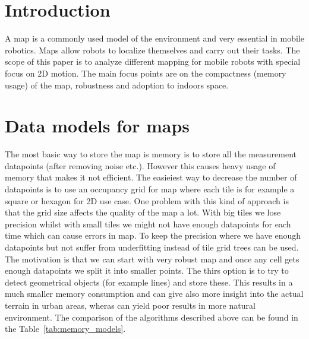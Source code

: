 \documentclass[12pt, a4paper, onecolumn]{article}
\begin{document}
\maketitle

\section{Introduction}
A map is a commonly used model of the environment and very essential in mobile robotics. Maps allow robots to localize themselves and carry out their tasks.
The scope of this paper is to analyze different mapping for mobile robots with special focus on 2D motion.
The main focus points are on the compactness (memory usage) of the map, robustness and adoption to indoors space.


\section{Data models for maps}
The most basic way to store the map is memory is to store all the measurement datapoints (after removing noise etc.).
However this causes heavy usage of memory that makes it not efficient.
The easieiest way to decrease the number of datapoints is to use an occupancy grid for map where each tile is for example a square or hexagon for 2D use case.
One problem with this kind of approach is that the grid size affects the quality of the map a lot.
With big tiles we lose precision whilst with small tiles we might not have enough datapoints for each time which can cause errors in map.
To keep the precision where we have enough datapoints but not suffer from underfitting instead of tile grid trees can be used.
The motivation is that we can start with very robust map and once any cell gets enough datapoints we split it into smaller points.
The thirs option is to try to detect geometrical objects (for example lines) and store these.
This results in a much smaller memory consumption and can give also more insight into the actual terrain in urban areas, wheras can yield poor results in more natural environment.
\cite{AlgorithmsForIndoorMapping}
The comparison of the algorithms described above can be found in the Table~\ref{tab:memory_models}.
\end{document}
